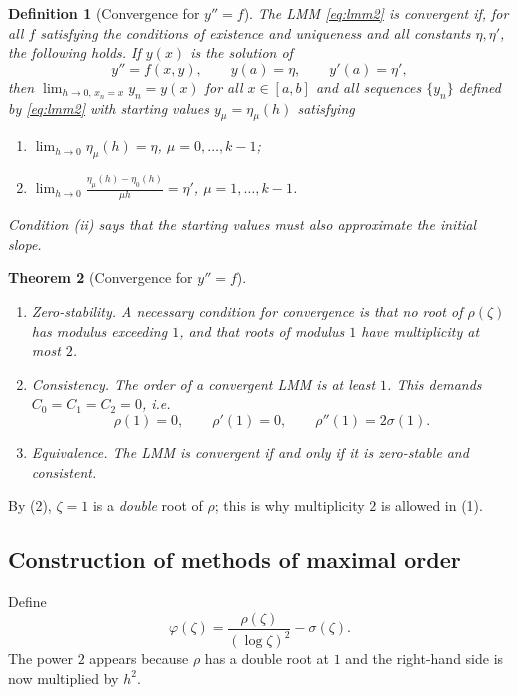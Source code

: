 \documentclass[11pt,a4paper]{article}
\numberwithin{equation}{section}
\theoremstyle{spacedplain}
\newtheorem{theorem}{Theorem}[section]
\theoremstyle{spaceddefinition}
\newtheorem{definition}[theorem]{Definition}
\theoremstyle{spacedremark}
\begin{document}
\begin{definition}[Convergence for \(y''=f\)]
The LMM \eqref{eq:lmm2} is \emph{convergent} if, for all \(f\)
satisfying the conditions of existence and uniqueness and all
constants \(\eta,\eta'\), the following holds.  If \(y(x)\) is the
solution of
\[
  y''=f(x,y),\qquad y(a)=\eta,\qquad y'(a)=\eta',
\]
then \(\lim_{h\to0,\,x_n=x}y_n=y(x)\) for all \(x\in[a,b]\) and all
sequences \(\{y_n\}\) defined by \eqref{eq:lmm2} with starting values
\(y_\mu=\eta_\mu(h)\) satisfying
\begin{enumerate}[label=(\roman*)]
  \item \(\lim_{h\to0}\eta_\mu(h)=\eta\), \quad \(\mu=0,\dots,k-1\);
  \item \(\displaystyle\lim_{h\to0}\frac{\eta_\mu(h)-\eta_0(h)}{\mu h}
    =\eta'\), \quad \(\mu=1,\dots,k-1\).
\end{enumerate}
Condition (ii) says that the starting values must also approximate
the initial \emph{slope}.
\end{definition}

\begin{keybox}
\begin{theorem}[Convergence for \(y''=f\)]\label{thm:conv2}
\leavevmode
\begin{enumerate}[label=(\arabic*)]
  \item \emph{Zero-stability.}  A necessary condition for convergence
    is that no root of \(\rho(\zeta)\) has modulus exceeding \(1\), and
    that roots of modulus \(1\) have multiplicity at most \(2\).
  \item \emph{Consistency.}  The order of a convergent LMM is at least
    \(1\).  This demands \mbox{\(C_0=C_1=C_2=0\)}, i.e.
    \[
      \rho(1)=0,\qquad\rho'(1)=0,\qquad\rho''(1)=2\sigma(1).
    \]
  \item \emph{Equivalence.}  The LMM is convergent if and only if it
    is zero-stable and consistent.
\end{enumerate}
\end{theorem}
\end{keybox}

By (2), \(\zeta=1\) is a \emph{double} root of \(\rho\); this is why
multiplicity \(2\) is allowed in (1).

\subsection*{Construction of methods of maximal order}

Define
\[
  \varphi(\zeta)=\frac{\rho(\zeta)}{(\log\zeta)^2}-\sigma(\zeta).
\]
The power \(2\) appears because \(\rho\) has a double root at \(1\)
and the right-hand side is now multiplied by \(h^2\).
\end{document}
